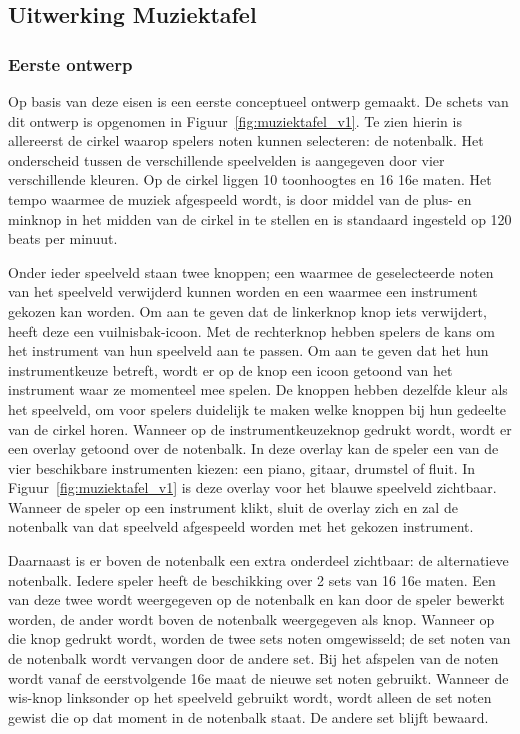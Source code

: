 \documentclass{acm}
\begin{document}
\subsection{Uitwerking Muziektafel}
\subsubsection{Eerste ontwerp}

Op basis van deze eisen is een eerste conceptueel ontwerp gemaakt. De schets van dit ontwerp is opgenomen in Figuur~\ref{fig:muziektafel_v1}. Te zien hierin is allereerst de cirkel waarop spelers noten kunnen selecteren: de notenbalk. Het onderscheid tussen de verschillende speelvelden is aangegeven door vier verschillende kleuren. Op de cirkel liggen 10 toonhoogtes en 16 16e maten. Het tempo waarmee de muziek afgespeeld wordt, is door middel van de plus- en minknop in het midden van de cirkel in te stellen en is standaard ingesteld op 120 beats per minuut.

Onder ieder speelveld staan twee knoppen; een waarmee de geselecteerde noten van het speelveld verwijderd kunnen worden en een waarmee een instrument gekozen kan worden. Om aan te geven dat de linkerknop knop iets verwijdert, heeft deze een vuilnisbak-icoon. Met de rechterknop hebben spelers de kans om het instrument van hun speelveld aan te passen. Om aan te geven dat het hun instrumentkeuze betreft, wordt er op de knop een icoon getoond van het instrument waar ze momenteel mee spelen. De knoppen hebben dezelfde kleur als het speelveld, om voor spelers duidelijk te maken welke knoppen bij hun gedeelte van de cirkel horen. Wanneer op de instrumentkeuzeknop gedrukt wordt, wordt er een overlay getoond over de notenbalk. In deze overlay kan de speler een van de vier beschikbare instrumenten kiezen: een piano, gitaar, drumstel of fluit. In Figuur~\ref{fig:muziektafel_v1} is deze overlay voor het blauwe speelveld zichtbaar. Wanneer de speler op een instrument klikt, sluit de overlay zich en zal de notenbalk van dat speelveld afgespeeld worden met het gekozen instrument.

Daarnaast is er boven de notenbalk een extra onderdeel zichtbaar: de alternatieve notenbalk. Iedere speler heeft de beschikking over 2 sets van 16 16e maten. Een van deze twee wordt weergegeven op de notenbalk en kan door de speler bewerkt worden, de ander wordt boven de notenbalk weergegeven als knop. Wanneer op die knop gedrukt wordt, worden de twee sets noten omgewisseld; de set noten van de notenbalk wordt vervangen door de andere set. Bij het afspelen van de noten wordt vanaf de eerstvolgende 16e maat de nieuwe set noten gebruikt. Wanneer de wis-knop linksonder op het speelveld gebruikt wordt, wordt alleen de set noten gewist die op dat moment in de notenbalk staat. De andere set blijft bewaard.
\end{document}
